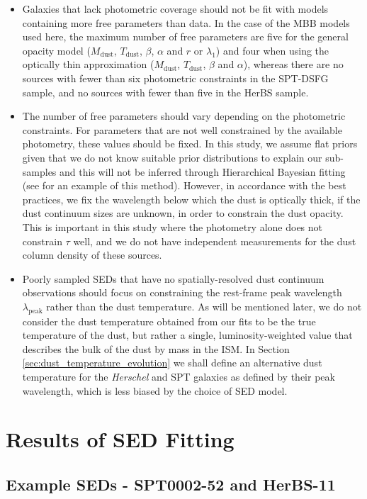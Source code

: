 \begin{itemize}
	\item Galaxies that lack photometric coverage should not be fit with models containing more free parameters than data. In the case of the MBB models used here, the maximum number of free parameters are five for the general opacity model ($M_{\textrm{dust}}$, $T_{\textrm{dust}}$, $\beta$, $\alpha$ and $r$ or $\lambda_1$) and four when using the optically thin approximation ($M_{\textrm{dust}}$, $T_{\textrm{dust}}$, $\beta$ and $\alpha$), whereas there are no sources with fewer than six photometric constraints in the SPT-DSFG sample, and no sources with fewer than five in the HerBS sample.
	\item The number of free parameters should vary depending on the photometric constraints. For parameters that are not well constrained by the available photometry, these values should be fixed. In this study, we assume flat priors given that we do not know suitable prior distributions to explain our sub-samples and this will not be inferred through Hierarchical Bayesian fitting (see \citealt{Lamperti_2019} for an example of this method). However, in accordance with the best practices, we fix the wavelength below which the dust is optically thick, if the dust continuum sizes are unknown, in order to constrain the dust opacity. This is important in this study where the photometry alone does not constrain $\tau$ well, and we do not have independent measurements for the dust column density of these sources. 
	\item Poorly sampled SEDs that have no spatially-resolved dust continuum observations should focus on constraining the rest-frame peak wavelength $\lambda_{\textrm{peak}}$ rather than the dust temperature. As will be mentioned later, we do not consider the dust temperature obtained from our fits to be the true temperature of the dust, but rather a single, luminosity-weighted value that describes the bulk of the dust by mass in the ISM. In Section \ref{sec:dust_temperature_evolution} we shall define an alternative dust temperature for the \textit{Herschel} and SPT galaxies as defined by their peak wavelength, which is less biased by the choice of SED model.
\end{itemize}

\section{Results of SED Fitting}

\subsection{Example SEDs - SPT0002-52 and HerBS-11}

